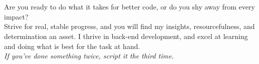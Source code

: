 \noindent\begin{minipage}[l]{0.9\textwidth}
\noindent\\
\\
Are you ready to do what it takes for better code, or do you shy away from every impact?\\
Strive for real, stable progress, and you will find my insights, resourcefulness, and determination an asset. I thrive in back-end development, and excel at learning and doing what is best for the task at hand.\\[5pt]
\textit{If you've done something twice, script it the third time.}
\end{minipage}
